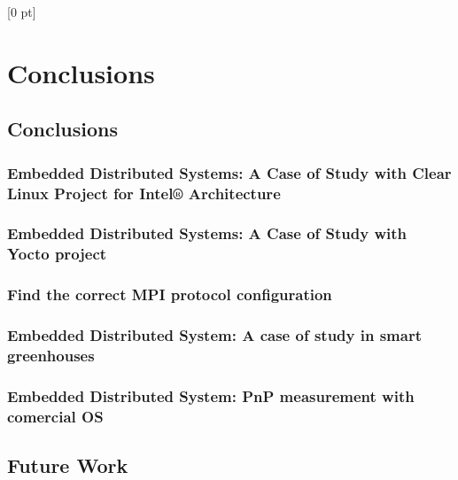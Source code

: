 \titlespacing{\chapter}{0 pt}{30 pt}{50 pt}[0 pt]
\titleformat{\section}{\Large\bfseries}{\thesection}{0 pt}{\hspace{30 pt}}
\titleformat{\subsection}{\large\bfseries}{\thesubsection}{0 pt}{\hspace{30 pt}}
\pagestyle{fancy}
\fancyhead[LO,LE]{\footnotesize\emph{\leftmark}}
\fancyhead[RO,RE]{\thepage}
\fancyfoot[CO,CE]{}

\chapter{Conclusions}

\normalsize
\noindent

\section{Conclusions}
\noindent

    \subsection {Embedded Distributed Systems: A Case of Study with Clear Linux
    Project for Intel® Architecture}
    \noindent

    \subsection {Embedded Distributed Systems: A Case of Study with Yocto project}
    \noindent

    \subsection{Find the correct MPI protocol configuration}
    \noindent

    \subsection{Embedded Distributed System: A case of study in smart greenhouses}
    \noindent

    \subsection{Embedded Distributed System: PnP measurement with comercial OS}
    \noindent


\section{Future Work}
\noindent

\clearpage
